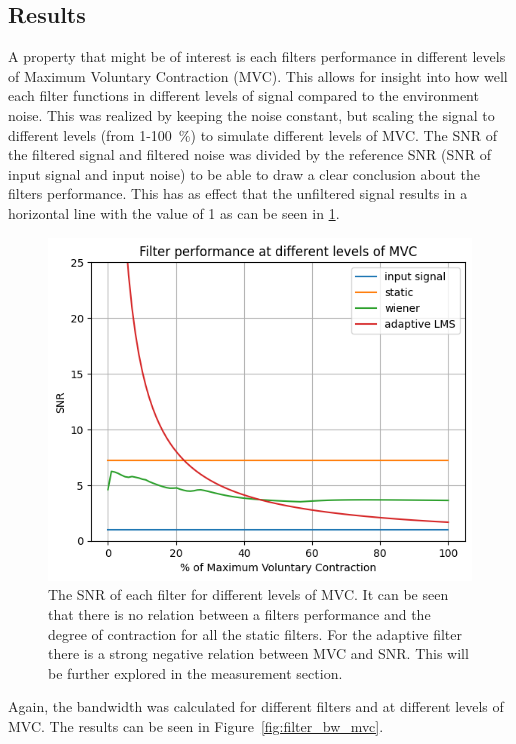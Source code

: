 \subsection{Results}
A property that might be of interest is each filters performance in different levels of Maximum Voluntary Contraction (MVC). This allows for insight into how well each filter functions in different levels of signal compared to the environment noise. This was realized by keeping the noise constant, but scaling the signal to different levels (from 1-\SI{100}{\percent}) to simulate different levels of MVC. The SNR of the filtered signal and filtered noise was divided by the reference SNR (SNR of input signal and input noise) to be able to draw a clear conclusion about the filters performance. This has as effect that the unfiltered signal results in a horizontal line with the value of 1 as can be seen in \ref{fig:filter_snr_mvc}.

\begin{figure}[h!t]
	\begin{center}
		\includegraphics[width=0.7\columnwidth]{images/filter_snr_mvc.png}
	\end{center}
	\caption{The SNR of each filter for different levels of MVC. It can be seen that there is no relation between a filters performance and the degree of contraction for all the static filters. For the adaptive filter there is a strong negative relation between MVC and SNR. This will be further explored in the measurement section.}
	\label{fig:filter_snr_mvc}
\end{figure}

Again, the bandwidth was calculated for different filters and at different levels of MVC. The results can be seen in Figure~\ref{fig:filter_bw_mvc}.

